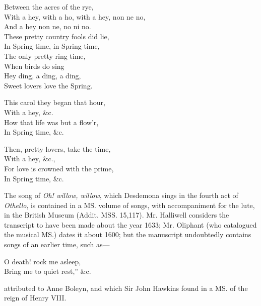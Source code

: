 \settowidth{\versewidth}{With a hey, with a ho, with a hey, non ne no,}
\begin{dcverse}\begin{patverse}
Between the acres of the rye,\\
With a hey, with a ho, with a hey, non ne no,\\
And a hey non ne, no ni no.\\
These pretty country fools did lie,\\
In Spring time, in Spring time,\\
The only pretty ring time,\\
When birds do sing\\
Hey ding, a ding, a ding,\\
Sweet lovers love the Spring.
\end{patverse}

\settowidth{\versewidth}{This carol they began that hour,}
\begin{patverse}
This carol they began that hour,\\
With a hey, \&c.\\
How that life was but a flow’r,\\
In Spring time, \&c.
\end{patverse}

\begin{patverse}
Then, pretty lovers, take the time,\\
With a hey, \&c.,\\
For love is crowned with the prime,\\
In Spring time, \&c.
\end{patverse}
\end{dcverse}
\pagebreak


The song of \textit{Oh! willow, willow}, which Desdemona sings in the fourth act of
\textit{Othello}, is contained in a MS. volume of songs, with accompaniment for the lute,
in the British Museum (Addit. MSS. 15,117). Mr. Halliwell considers the
transcript to have been made about the year 1633; Mr. Oliphant (who catalogued
the musical MS.) dates it about 1600; but the manuscript undoubtedly contains
songs of an earlier time, such as—
\settowidth{\versewidth}{O death! rock me asleep,}
\begin{scverse}
O death! rock me asleep,\\
Bring me to quiet rest,” \&c.
\end{scverse}
attributed to Anne Boleyn, and which Sir John Hawkins found in a MS. of the
reign of Henry VIII.

